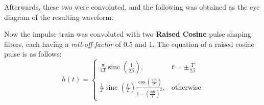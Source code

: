 \documentclass{article}
\begin{document}
        \begin{figure}[!htb]
                \centering
        \end{figure}

        Afterwards, these two were convoluted, and the following was obtained as the eye diagram of the resulting waveform.
        \begin{figure}[!htb]
                \centering
        \end{figure}

        Now the impulse train was convoluted with two \textbf{Raised Cosine} pulse shaping filters, each having a \textit{roll-off factor} of 0.5 and 1. The equation of a raised cosine pulse is as follows:\\

        \[h(t) = \begin{cases}
                \frac{\pi}{4T} \operatorname{sinc}\left(\frac{1}{2\beta}\right), & t = \pm \frac{T}{2\beta} \\
                \frac{1}{T} \operatorname{sinc}\left(\frac{t}{T}\right) \frac{\cos\left(\frac{\pi \beta t}{T}\right)}{1 - \left(\frac{2\beta t}{T}\right)^2}, & \text{otherwise}
            \end{cases}\]\\
\end{document}
